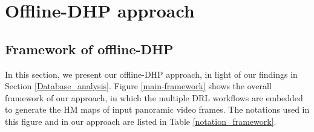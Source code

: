 \documentclass[10pt,journal,compsoc]{IEEEtran}
\begin{document}



\section{Offline-DHP approach}\label{sec::offline-DHP}

\subsection{Framework of offline-DHP}
\label{framework}

In this section, we present our offline-DHP approach, in light of our findings in Section \ref{Database_analysis}.
Figure \ref{main-framework} shows the overall framework of our approach, in which the multiple DRL workflows are embedded to generate the HM maps of input panoramic video frames. The notations used in this figure and in our approach are listed in Table \ref{notation_framework}.





\end{document}
